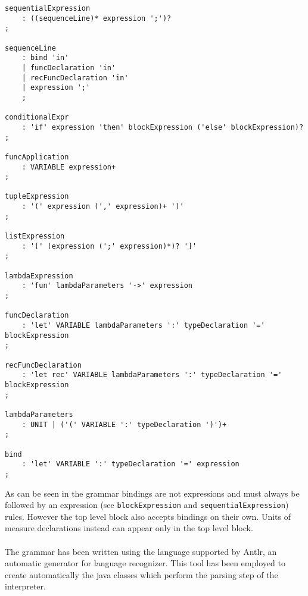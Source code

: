 \documentclass[]{article}
\begin{document}
\begin{lstlisting}[caption={Grammar}, label=grammar]
sequentialExpression
	: ((sequenceLine)* expression ';')?
;
	
sequenceLine
	: bind 'in'
	| funcDeclaration 'in'
	| recFuncDeclaration 'in'
	| expression ';'
	;
	
conditionalExpr
	: 'if' expression 'then' blockExpression ('else' blockExpression)?
;
	
funcApplication
	: VARIABLE expression+ 
;
	
tupleExpression
	: '(' expression (',' expression)+ ')'
;
	
listExpression
	: '[' (expression (';' expression)*)? ']'
;
	
lambdaExpression
	: 'fun' lambdaParameters '->' expression
;
	
funcDeclaration
	: 'let' VARIABLE lambdaParameters ':' typeDeclaration '=' blockExpression
;
	
recFuncDeclaration
	: 'let rec' VARIABLE lambdaParameters ':' typeDeclaration '=' blockExpression
;
	
lambdaParameters
	: UNIT | ('(' VARIABLE ':' typeDeclaration ')')+
;
	
bind
	: 'let' VARIABLE ':' typeDeclaration '=' expression
;
			\end{lstlisting}		
			As can be seen in the grammar bindings are not expressions and must always be followed by an expression (see \lstinline|blockExpression| and \lstinline|sequentialExpression|) rules. However the top level block also accepts bindings on their own. Units of measure declarations instead can appear only in the top level block. \\\\
			The grammar has been written using the language supported by Antlr, an automatic generator for language recognizer. This tool has been employed to create automatically the java classes which perform the parsing step of the interpreter.
		
\end{document}
